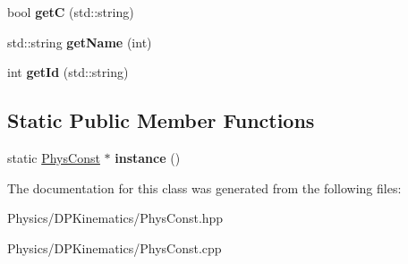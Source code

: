 \begin{DoxyCompactItemize}
\item 
\hypertarget{class_phys_const_a3a28b605f82f3f53527b46f56618a6a1}{bool {\bfseries get\-C} (std\-::string)}\label{class_phys_const_a3a28b605f82f3f53527b46f56618a6a1}

\item 
\hypertarget{class_phys_const_a2a69e3e63c47031d42c9c5ca7f94ebc1}{std\-::string {\bfseries get\-Name} (int)}\label{class_phys_const_a2a69e3e63c47031d42c9c5ca7f94ebc1}

\item 
\hypertarget{class_phys_const_adf924928f5c6d7de2cc54aa6d9c4bdc7}{int {\bfseries get\-Id} (std\-::string)}\label{class_phys_const_adf924928f5c6d7de2cc54aa6d9c4bdc7}

\end{DoxyCompactItemize}
\subsection*{Static Public Member Functions}
\begin{DoxyCompactItemize}
\item 
\hypertarget{class_phys_const_a873d624084dcae0629978e11de5d931b}{static \hyperlink{class_phys_const}{Phys\-Const} $\ast$ {\bfseries instance} ()}\label{class_phys_const_a873d624084dcae0629978e11de5d931b}

\end{DoxyCompactItemize}


The documentation for this class was generated from the following files\-:\begin{DoxyCompactItemize}
\item 
Physics/\-D\-P\-Kinematics/Phys\-Const.\-hpp\item 
Physics/\-D\-P\-Kinematics/Phys\-Const.\-cpp\end{DoxyCompactItemize}
